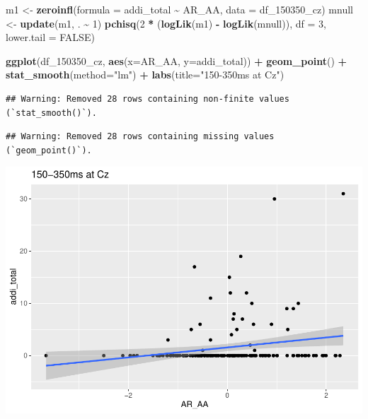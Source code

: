 \documentclass[
]{article}
\newenvironment{Shaded}{\begin{snugshade}}{\end{snugshade}}
\newcommand{\AttributeTok}[1]{\textcolor[rgb]{0.13,0.29,0.53}{#1}}
\newcommand{\ConstantTok}[1]{\textcolor[rgb]{0.56,0.35,0.01}{#1}}
\newcommand{\DecValTok}[1]{\textcolor[rgb]{0.00,0.00,0.81}{#1}}
\newcommand{\FunctionTok}[1]{\textcolor[rgb]{0.13,0.29,0.53}{\textbf{#1}}}
\newcommand{\NormalTok}[1]{#1}
\newcommand{\OtherTok}[1]{\textcolor[rgb]{0.56,0.35,0.01}{#1}}
\newcommand{\SpecialCharTok}[1]{\textcolor[rgb]{0.81,0.36,0.00}{\textbf{#1}}}
\newcommand{\StringTok}[1]{\textcolor[rgb]{0.31,0.60,0.02}{#1}}
\begin{document}
\begin{Shaded}
\begin{Highlighting}[]
\NormalTok{m1 }\OtherTok{\textless{}{-}} \FunctionTok{zeroinfl}\NormalTok{(}\AttributeTok{formula =}\NormalTok{ addi\_total }\SpecialCharTok{\textasciitilde{}}\NormalTok{ AR\_AA, }\AttributeTok{data =}\NormalTok{ df\_150350\_cz)}
\NormalTok{mnull }\OtherTok{\textless{}{-}} \FunctionTok{update}\NormalTok{(m1, . }\SpecialCharTok{\textasciitilde{}} \DecValTok{1}\NormalTok{)}
\FunctionTok{pchisq}\NormalTok{(}\DecValTok{2} \SpecialCharTok{*}\NormalTok{ (}\FunctionTok{logLik}\NormalTok{(m1) }\SpecialCharTok{{-}} \FunctionTok{logLik}\NormalTok{(mnull)), }\AttributeTok{df =} \DecValTok{3}\NormalTok{, }\AttributeTok{lower.tail =} \ConstantTok{FALSE}\NormalTok{)}

\FunctionTok{ggplot}\NormalTok{(df\_150350\_cz, }\FunctionTok{aes}\NormalTok{(}\AttributeTok{x=}\NormalTok{AR\_AA, }\AttributeTok{y=}\NormalTok{addi\_total)) }\SpecialCharTok{+}
  \FunctionTok{geom\_point}\NormalTok{() }\SpecialCharTok{+}
  \FunctionTok{stat\_smooth}\NormalTok{(}\AttributeTok{method=}\StringTok{"lm"}\NormalTok{) }\SpecialCharTok{+}
  \FunctionTok{labs}\NormalTok{(}\AttributeTok{title=}\StringTok{"150{-}350ms at Cz"}\NormalTok{)}
\end{Highlighting}
\end{Shaded}

\begin{verbatim}
## Warning: Removed 28 rows containing non-finite values (`stat_smooth()`).
\end{verbatim}

\begin{verbatim}
## Warning: Removed 28 rows containing missing values (`geom_point()`).
\end{verbatim}

\includegraphics{do01_BUDS_files/figure-latex/unnamed-chunk-28-1.pdf}
\end{document}

